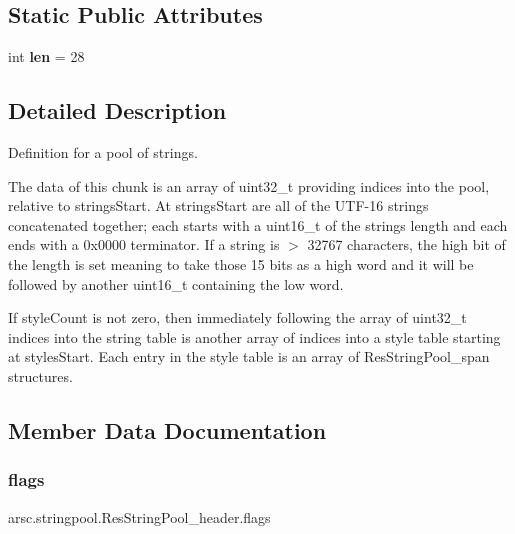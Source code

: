 \subsection*{Static Public Attributes}
\begin{DoxyCompactItemize}
\item 
\mbox{\label{classarsc_1_1stringpool_1_1ResStringPool__header_ab3a3bad3af29a7749ddd28a276287573}} 
int {\bfseries len} = 28
\end{DoxyCompactItemize}


\subsection{Detailed Description}
Definition for a pool of strings. 

The data of this chunk is an array of uint32\+\_\+t providing indices into the pool, relative to strings\+Start. At strings\+Start are all of the U\+T\+F-\/16 strings concatenated together; each starts with a uint16\+\_\+t of the string\textquotesingle{}s length and each ends with a 0x0000 terminator. If a string is $>$ 32767 characters, the high bit of the length is set meaning to take those 15 bits as a high word and it will be followed by another uint16\+\_\+t containing the low word.

If style\+Count is not zero, then immediately following the array of uint32\+\_\+t indices into the string table is another array of indices into a style table starting at styles\+Start. Each entry in the style table is an array of Res\+String\+Pool\+\_\+span structures. 

\subsection{Member Data Documentation}
\mbox{\label{classarsc_1_1stringpool_1_1ResStringPool__header_a66f1d4497df05a8d7e41c51c0a6e4bed}} 
\subsubsection{\texorpdfstring{flags}{flags}}
{\footnotesize\ttfamily arsc.\+stringpool.\+Res\+String\+Pool\+\_\+header.\+flags}



